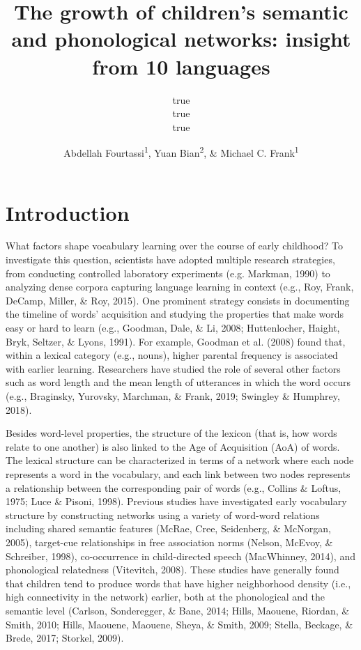 \documentclass[english,,man,floatsintext]{apa6}
\title{The growth of children's semantic and phonological networks: insight from 10 languages}
\author{true \\ true \\ true}
\date{}
\author{Abdellah Fourtassi\textsuperscript{1}, Yuan Bian\textsuperscript{2}, \& Michael C. Frank\textsuperscript{1}}
\affiliation{
\vspace{0.5cm}
\textsuperscript{1} Department of Psychology, Stanford University\\\textsuperscript{2} Department of Brain and Cognitive Sciences, Massachusetts Institute of Technology}
\begin{document}
\maketitle

\hypertarget{introduction}{%
\section{Introduction}\label{introduction}}

What factors shape vocabulary learning over the course of early childhood? To investigate this question, scientists have adopted multiple research strategies, from conducting controlled laboratory experiments (e.g. Markman, 1990) to analyzing dense corpora capturing language learning in context (e.g., Roy, Frank, DeCamp, Miller, \& Roy, 2015). One prominent strategy consists in documenting the timeline of words' acquisition and studying the properties that make words easy or hard to learn (e.g., Goodman, Dale, \& Li, 2008; Huttenlocher, Haight, Bryk, Seltzer, \& Lyons, 1991). For example, Goodman et al. (2008) found that, within a lexical category (e.g., nouns), higher parental frequency is associated with earlier learning. Researchers have studied the role of several other factors such as word length and the mean length of utterances in which the word occurs (e.g., Braginsky, Yurovsky, Marchman, \& Frank, 2019; Swingley \& Humphrey, 2018).

Besides word-level properties, the structure of the lexicon (that is, how words relate to one another) is also linked to the Age of Acquisition (AoA) of words. The lexical structure can be characterized in terms of a network where each node represents a word in the vocabulary, and each link between two nodes represents a relationship between the corresponding pair of words (e.g., Collins \& Loftus, 1975; Luce \& Pisoni, 1998). Previous studies have investigated early vocabulary structure by constructing networks using a variety of word-word relations including shared semantic features (McRae, Cree, Seidenberg, \& McNorgan, 2005), target-cue relationships in free association norms (Nelson, McEvoy, \& Schreiber, 1998), co-occurrence in child-directed speech (MacWhinney, 2014), and phonological relatedness (Vitevitch, 2008). These studies have generally found that children tend to produce words that have higher neighborhood density (i.e., high connectivity in the network) earlier, both at the phonological and the semantic level (Carlson, Sonderegger, \& Bane, 2014; Hills, Maouene, Riordan, \& Smith, 2010; Hills, Maouene, Maouene, Sheya, \& Smith, 2009; Stella, Beckage, \& Brede, 2017; Storkel, 2009).
\end{document}
